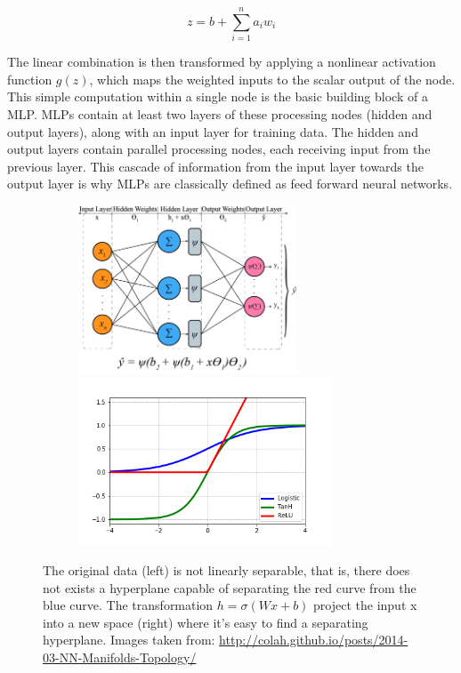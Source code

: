     \begin{equation} \label{eq:lincomb}
        z = b + \sum_{i=1}^{n}  a_i w_i
    \end{equation}

The linear combination is then transformed by applying a nonlinear activation function $g(z)$, which maps the weighted inputs to the scalar output of the node. This simple computation within a single node is the basic building block of a MLP. MLPs contain at least two layers of these processing nodes (hidden and output layers), along with an input layer for training data. The hidden and output layers contain parallel processing nodes, each receiving input from the previous layer. This cascade of information from the input layer towards the output layer is why MLPs are classically defined as feed forward neural networks. 

    \begin{figure}[h!]
        \centering
        \begin{subfigure}{\linewidth}
            \centering
        	\includegraphics[width=.55\linewidth, height = 5cm]{img/mlp.png}\label{fig:nonlinearsep}\hfill
        	\includegraphics[width=.4\linewidth, height = 5cm]{img/actfunc.png}\label{fig:linearsep}
        \end{subfigure}
        
        \caption{The original data (left) is not linearly separable, that is, there does not exists a hyperplane capable of
            separating the red curve from the blue curve. The transformation $h = \sigma(Wx + b)$ project the input x into a new space
        (right) where it's easy to find a separating hyperplane. Images taken from: \url{http://colah.github.io/posts/2014-03-NN-Manifolds-Topology/}}\label{fig:linear-layer-viz}
	\end{figure}
	
